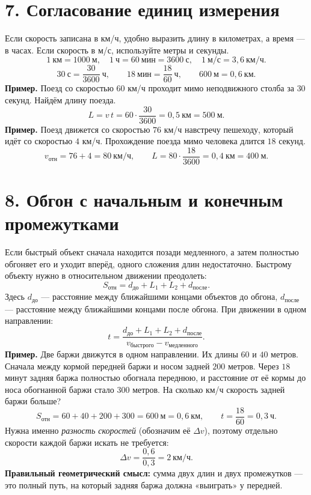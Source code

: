 \documentclass[a4paper,12pt]{article}
\newcommand{\sectiontitle}[1]{\section*{\color{darkaccent}#1}\vspace{-2mm}}
\newcommand{\key}[1]{\textcolor{darkaccent}{\textbf{#1}}}
\newcommand{\exlabel}[1]{\textbf{\color{darkaccent}Пример.} #1}
\newcommand{\vrel}{v_{\text{отн}}}
\begin{document}
\sectiontitle{7. Согласование единиц измерения}
Если скорость записана в км/ч, удобно выразить длину в километрах, а время --- в часах. Если скорость в м/с, используйте метры и секунды.
\[
1\ \text{км}=1000\ \text{м},\quad
1\ \text{ч}=60\ \text{мин}=3600\ \text{с},\quad
1\ \text{м/с}=3{,}6\ \text{км/ч}.
\]
\[
30\ \text{с}=\frac{30}{3600}\ \text{ч},\qquad
18\ \text{мин}=\frac{18}{60}\ \text{ч},\qquad
600\ \text{м}=0{,}6\ \text{км}.
\]
\exlabel{Поезд со скоростью $60$ км/ч проходит мимо неподвижного столба за $30$ секунд. Найдём длину поезда.}
\[
L=v\,t=60\cdot\frac{30}{3600}=0{,}5\ \text{км}
=\boxed{500\ \text{м}}.
\]
\exlabel{Поезд движется со скоростью $76$ км/ч навстречу пешеходу, который идёт со скоростью $4$ км/ч. Прохождение поезда мимо человека длится $18$ секунд.}
\[
\vrel=76+4=80\ \text{км/ч},\qquad
L=80\cdot\frac{18}{3600}=0{,}4\ \text{км}
=\boxed{400\ \text{м}}.
\]

\clearpage
\sectiontitle{8. Обгон с начальным и конечным промежутками}
Если быстрый объект сначала находится позади медленного, а затем полностью обгоняет его и уходит вперёд, одного сложения длин недостаточно. Быстрому объекту нужно в относительном движении преодолеть:
\[
\boxed{S_{\text{отн}}=d_{\text{до}}+L_1+L_2+d_{\text{после}}.}
\]
Здесь $d_{\text{до}}$ --- расстояние между ближайшими концами объектов до обгона, $d_{\text{после}}$ --- расстояние между ближайшими концами после обгона. При движении в одном направлении:
\[
\boxed{t=\frac{d_{\text{до}}+L_1+L_2+d_{\text{после}}}
{v_{\text{быстрого}}-v_{\text{медленного}}}.}
\]
\exlabel{Две баржи движутся в одном направлении. Их длины $60$ и $40$ метров. Сначала между кормой передней баржи и носом задней $200$ метров. Через $18$ минут задняя баржа полностью обогнала переднюю, и расстояние от её кормы до носа обогнанной баржи стало $300$ метров. На сколько км/ч скорость задней баржи больше?}
\[
S_{\text{отн}}=60+40+200+300=600\ \text{м}=0{,}6\ \text{км},
\qquad t=\frac{18}{60}=0{,}3\ \text{ч}.
\]
Нужна именно \emph{разность скоростей} (обозначим её $\Delta v$), поэтому отдельно скорости каждой баржи искать не требуется:
\[
\Delta v=\frac{0{,}6}{0{,}3}=\boxed{2\ \text{км/ч}}.
\]
\key{Правильный геометрический смысл:} сумма двух длин и двух промежутков --- это полный путь, на который задняя баржа должна «выиграть» у передней.
\end{document}
